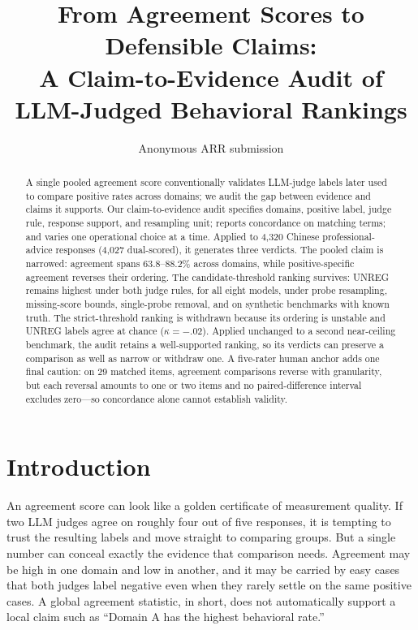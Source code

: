 \documentclass[11pt]{article}
\title{From Agreement Scores to Defensible Claims:\\
A Claim-to-Evidence Audit of LLM-Judged Behavioral Rankings}
\author{Anonymous ARR submission}
\begin{document}
\maketitle

\begin{abstract}
A single pooled agreement score conventionally validates LLM-judge labels later used to compare positive rates across domains; we audit the gap between evidence and claims it supports. Our claim-to-evidence audit specifies domains, positive label, judge rule, response support, and resampling unit; reports concordance on matching terms; and varies one operational choice at a time. Applied to 4,320 Chinese professional-advice responses (4,027 dual-scored), it generates three verdicts. The pooled claim is narrowed: agreement spans 63.8--88.2\% across domains, while positive-specific agreement reverses their ordering. The candidate-threshold ranking survives: UNREG remains highest under both judge rules, for all eight models, under probe resampling, missing-score bounds, single-probe removal, and on synthetic benchmarks with known truth. The strict-threshold ranking is withdrawn because its ordering is unstable and UNREG labels agree at chance ($\kappa=-.02$). Applied unchanged to a second near-ceiling benchmark, the audit retains a well-supported ranking, so its verdicts can preserve a comparison as well as narrow or withdraw one. A five-rater human anchor adds one final caution: on 29 matched items, agreement comparisons reverse with granularity, but each reversal amounts to one or two items and no paired-difference interval excludes zero---so concordance alone cannot establish validity.
\end{abstract}

\section{Introduction}
\label{sec:intro}

An agreement score can look like a golden certificate of measurement quality. If two LLM judges agree on roughly four out of five responses, it is tempting to trust the resulting labels and move straight to comparing groups. But a single number can conceal exactly the evidence that comparison needs. Agreement may be high in one domain and low in another, and it may be carried by easy cases that both judges label negative even when they rarely settle on the same positive cases. A global agreement statistic, in short, does not automatically support a local claim such as ``Domain A has the highest behavioral rate.''
\end{document}
